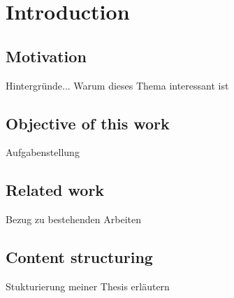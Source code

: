 \chapter{Introduction}
\label{ch:introduction}

\section{Motivation}
\label{section:motivation}
Hintergründe... Warum dieses Thema interessant ist
\section{Objective of this work}
\label{section:obejective}
Aufgabenstellung
\section{Related work}
\label{section:relatedwork}
Bezug zu bestehenden Arbeiten
\section{Content structuring}
\label{section:contentstructuring}
Stukturierung meiner Thesis erläutern

%
%
%
